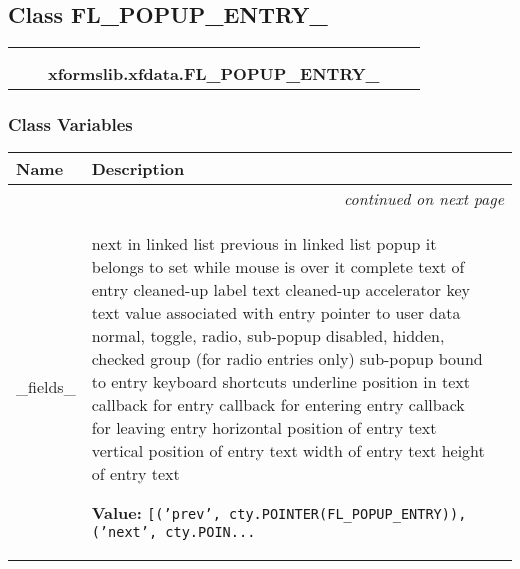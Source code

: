 

\subsection{Class FL\_POPUP\_ENTRY\_}

    \label{xformslib:xfdata:FL_POPUP_ENTRY_}
\begin{tabular}{cccccc}
\multicolumn{2}{r}{\settowidth{\BCL}{ctypes.Structure}\multirow{2}{\BCL}{ctypes.Structure}}
&&
  \\\cline{3-3}
  &&\multicolumn{1}{c|}{}
&&
  \\
&&\multicolumn{2}{l}{\textbf{xformslib.xfdata.FL\_POPUP\_ENTRY\_}}
\end{tabular}



  \subsubsection{Class Variables}

    \vspace{-1cm}
\hspace{\varindent}\begin{longtable}{|p{\varnamewidth}|p{\vardescrwidth}|l}
\cline{1-2}
\cline{1-2} \centering \textbf{Name} & \centering \textbf{Description}& \\
\cline{1-2}
\endhead\cline{1-2}\multicolumn{3}{r}{\small\textit{continued on next page}}\\\endfoot\cline{1-2}
\endlastfoot\raggedright \_\-f\-i\-e\-l\-d\-s\-\_\- & \raggedright next in linked list
previous in linked list
popup it belongs to
set while mouse is over it
complete text of entry
cleaned-up label text
cleaned-up accelerator key text
value associated with entry
pointer to user data
normal, toggle, radio, sub-popup
disabled, hidden, checked
group (for radio entries only)
sub-popup bound to entry
keyboard shortcuts
underline position in text
callback for entry
callback for entering entry
callback for leaving entry
horizontal position of entry text
vertical position of entry text
width of entry text
height of entry text

\textbf{Value:} 
{\tt [('prev', cty.POINTER(FL\_POPUP\_ENTRY)), ('next', cty.POIN\texttt{...}}&\\
\cline{1-2}
\end{longtable}

